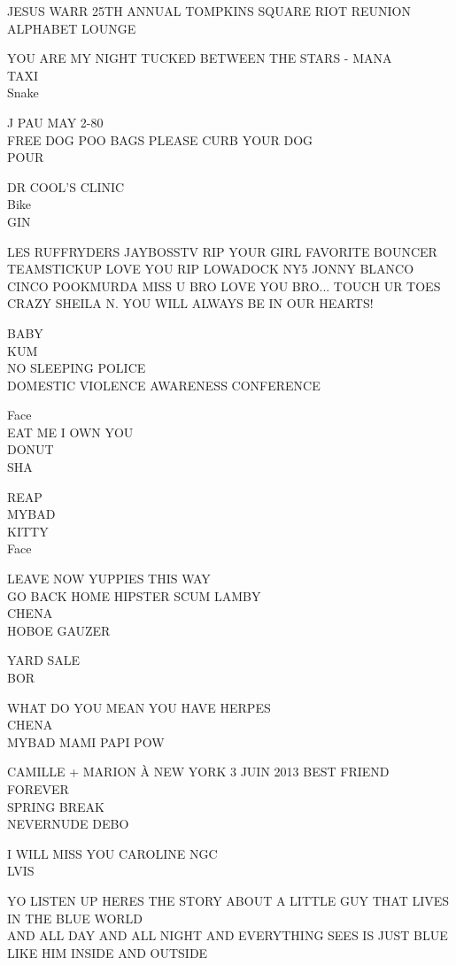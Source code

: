 \documentclass[10pt,letterpaper]{article}
\begin{document}
JESUS WARR 25TH ANNUAL TOMPKINS SQUARE RIOT REUNION\\
ALPHABET LOUNGE

YOU ARE MY NIGHT TUCKED BETWEEN THE STARS {-} MANA\\
TAXI\\
Snake

J PAU MAY 2{-}80\\
FREE DOG POO BAGS PLEASE CURB YOUR DOG\\
POUR

DR COOL'S CLINIC\\
Bike\\
GIN

LES RUFFRYDERS JAYBOSSTV RIP YOUR GIRL FAVORITE BOUNCER TEAMSTICKUP LOVE YOU RIP LOWADOCK NY5 JONNY BLANCO CINCO POOKMURDA MISS U BRO LOVE YOU BRO... TOUCH UR TOES\\
CRAZY SHEILA N. YOU WILL ALWAYS BE IN OUR HEARTS!

BABY\\
KUM\\
NO SLEEPING POLICE\\
DOMESTIC VIOLENCE AWARENESS CONFERENCE

Face\\
EAT ME I OWN YOU\\
DONUT\\
SHA

REAP\\
MYBAD\\
KITTY\\
Face

LEAVE NOW YUPPIES THIS WAY\\
GO BACK HOME HIPSTER SCUM LAMBY\\
CHENA\\
HOBOE GAUZER

YARD SALE\\
BOR

WHAT DO YOU MEAN YOU HAVE HERPES\\
CHENA\\
MYBAD MAMI PAPI POW

CAMILLE + MARION À NEW YORK 3 JUIN 2013 BEST FRIEND FOREVER\\
SPRING BREAK\\
NEVERNUDE DEBO

I WILL MISS YOU CAROLINE NGC\\
LVIS

YO LISTEN UP HERES THE STORY ABOUT A LITTLE GUY THAT LIVES IN THE BLUE WORLD\\
AND ALL DAY AND ALL NIGHT AND EVERYTHING SEES IS JUST BLUE LIKE HIM INSIDE AND OUTSIDE
\end{document}
